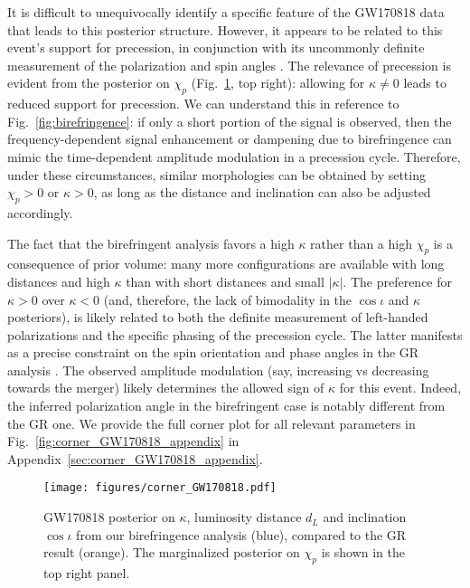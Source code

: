 \documentclass[aps,prd,twocolumn,superscriptaddress,preprintnumbers,floatfix,nofootinbib]{revtex4-2}
\begin{document}
It is difficult to unequivocally identify a specific feature of the GW170818 data that leads to this posterior structure.
However, it appears to be related to this event's support for precession, in conjunction with its uncommonly definite measurement of the polarization and spin angles \cite{Varma:2021csh}.
The relevance of precession is evident from the posterior on $\chi_p$ (Fig.~\ref{fig:corner_GW170818}, top right): allowing for $\kappa \neq 0$ leads to reduced support for precession.
We can understand this in reference to Fig.~\ref{fig:birefringence}: if only a short portion of the signal is observed, then the frequency-dependent signal enhancement or dampening due to birefringence can mimic the time-dependent amplitude modulation in a precession cycle.
Therefore, under these circumstances, similar morphologies can be obtained by setting $\chi_p > 0$ or $\kappa > 0$, as long as the distance and inclination can also be adjusted accordingly.

The fact that the birefringent analysis favors a high $\kappa$ rather than a high $\chi_p$ is a consequence of prior volume: many more configurations are available with long distances and high $\kappa$ than with short distances and small $|\kappa|$.
The preference for $\kappa > 0$ over $\kappa < 0$ (and, therefore, the lack of bimodality in the $\cos\iota$ and $\kappa$ posteriors), is likely related to both the definite measurement of left-handed polarizations and the specific phasing of the precession cycle.
The latter manifests as a precise constraint on the spin orientation and phase angles in the \ac{GR} analysis \cite{Varma:2021csh}.
The observed amplitude modulation (say, increasing vs decreasing towards the merger) likely determines the allowed sign of $\kappa$ for this event.
Indeed, the inferred polarization angle in the birefringent case is notably different from the \ac{GR} one.
We provide the full corner plot for all relevant parameters in Fig.~\ref{fig:corner_GW170818_appendix} in Appendix~\ref{sec:corner_GW170818_appendix}.

\begin{figure}
    \texttt{[image: figures/corner\_GW170818.pdf]}
    \caption{
        GW170818 posterior on $\kappa$, luminosity distance $d_L$ and inclination $\cos\iota$ from our birefringence analysis (blue), compared to the GR result (orange).
        The marginalized posterior on $\chi_p$ is shown in the top right panel.
    }
    \label{fig:corner_GW170818}
\end{figure}
\end{document}
